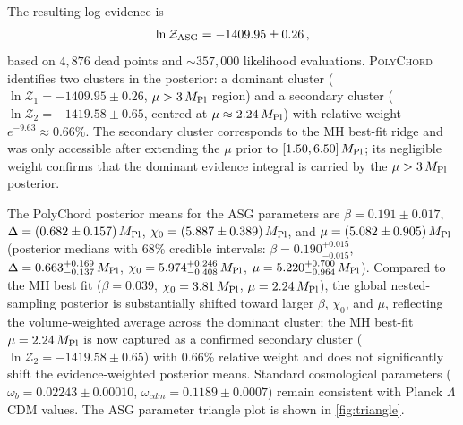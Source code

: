 \documentclass[11pt,a4paper]{article}
\begin{document}
The resulting log-evidence is
\begin{equation}
\ln\mathcal{Z}_{\rm ASG}=-1409.95\pm0.26\,,
\label{eq:lnZ}
\end{equation}
based on $4{,}876$ dead points and ${\sim}357{,}000$ likelihood evaluations. \textsc{PolyChord} identifies two clusters in the posterior: a dominant cluster ($\ln\mathcal{Z}_1=-1409.95\pm0.26$, $\mu>3\,M_{\rm Pl}$ region) and a secondary cluster ($\ln\mathcal{Z}_2=-1419.58\pm0.65$, centred at $\mu\approx2.24\,M_{\rm Pl}$) with relative weight $e^{-9.63}\approx0.66\%$. The secondary cluster corresponds to the MH best-fit ridge and was only accessible after extending the $\mu$ prior to $[1.50,6.50]\,M_{\rm Pl}$; its negligible weight confirms that the dominant evidence integral is carried by the $\mu>3\,M_{\rm Pl}$ posterior.

The PolyChord posterior means for the ASG parameters are $\beta=0.191\pm0.017$, $\Delta=(0.682\pm0.157)\,M_{\rm Pl}$, $\chi_0=(5.887\pm0.389)\,M_{\rm Pl}$, and $\mu=(5.082\pm0.905)\,M_{\rm Pl}$ (posterior medians with 68\% credible intervals: $\beta=0.190^{+0.015}_{-0.015}$, $\Delta=0.663^{+0.169}_{-0.137}\,M_{\rm Pl}$, $\chi_0=5.974^{+0.246}_{-0.408}\,M_{\rm Pl}$, $\mu=5.220^{+0.700}_{-0.964}\,M_{\rm Pl}$). Compared to the MH best fit ($\beta=0.039$, $\chi_0=3.81\,M_{\rm Pl}$, $\mu=2.24\,M_{\rm Pl}$), the global nested-sampling posterior is substantially shifted toward larger $\beta$, $\chi_0$, and $\mu$, reflecting the volume-weighted average across the dominant cluster; the MH best-fit $\mu=2.24\,M_{\rm Pl}$ is now captured as a confirmed secondary cluster ($\ln\mathcal{Z}_2=-1419.58\pm0.65$) with 0.66\% relative weight and does not significantly shift the evidence-weighted posterior means. Standard cosmological parameters ($\omega_b=0.02243\pm0.00010$, $\omega_{cdm}=0.1189\pm0.0007$) remain consistent with Planck $\Lambda$CDM values. The ASG parameter triangle plot is shown in \cref{fig:triangle}.
\end{document}
